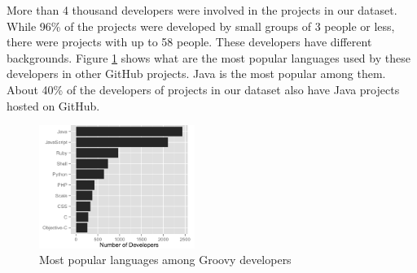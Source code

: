 \documentclass[preprint]{sigplanconf}
\begin{document}
More than 4 thousand developers were involved in the projects in our dataset.
While 96\% of the projects were developed by small groups of 3 people or less, there were projects with up to 58 people.
These developers have different backgrounds.
Figure \ref{fig:other_languages} shows what are the most popular languages used by these developers in other GitHub projects. 
Java is the most popular among them.
About 40\% of the developers of projects in our dataset also have Java projects hosted on GitHub.

 

\begin{figure}[h]
\centering \includegraphics[width=0.45\textwidth]{../analysis/result/languages.png}
\caption{Most popular languages among Groovy developers}
\label{fig:other_languages} 
\end{figure}

\end{document}
